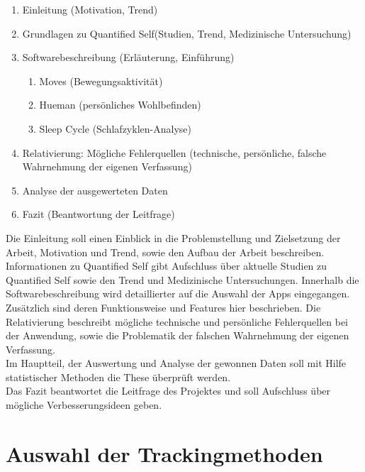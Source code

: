 \begin{enumerate}
\def\labelenumi{\arabic{enumi}.}
\itemsep1pt\parskip0pt
\item
  Einleitung (Motivation, Trend)
\item
  Grundlagen zu Quantified Self(Studien, Trend, Medizinische
  Untersuchung)
\item
  Softwarebeschreibung (Erläuterung, Einführung)

  \begin{enumerate}
  \def\labelenumii{\alph{enumii}.}
  \itemsep1pt\parskip0pt
  \item
    Moves (Bewegungsaktivität)\\
  \item
    Hueman (persönliches Wohlbefinden)\\
  \item
    Sleep Cycle (Schlafzyklen-Analyse)
  \end{enumerate}
\item
  Relativierung: Mögliche Fehlerquellen (technische, persönliche,
  falsche Wahrnehmung der eigenen Verfassung)
\item
  Analyse der ausgewerteten Daten
\item
  Fazit (Beantwortung der Leitfrage)
\end{enumerate}

Die Einleitung soll einen Einblick in die Problemstellung und Zielsetzung der Arbeit, Motivation und Trend, sowie den Aufbau der Arbeit beschreiben.
Informationen zu Quantified Self gibt Aufschluss über aktuelle Studien zu Quantified Self sowie den Trend und Medizinische Untersuchungen.
Innerhalb die Softwarebeschreibung wird detaillierter auf die Auswahl der Apps eingegangen.\\
Zusätzlich sind deren Funktionsweise und Features hier beschrieben.
Die Relativierung beschreibt mögliche technische und persönliche Fehlerquellen bei der Anwendung, sowie die Problematik der falschen Wahrnehmung der eigenen Verfassung.
\\
Im Hauptteil, der Auswertung und Analyse der gewonnen Daten soll mit Hilfe statistischer Methoden die These überprüft werden.
\\
Das Fazit beantwortet die Leitfrage des Projektes und soll Aufschluss über mögliche Verbesserungsideen geben.

\section{Auswahl der Trackingmethoden}
\label{ch:Einleitung:sec:AuswahlDerTrackingmethoden}

